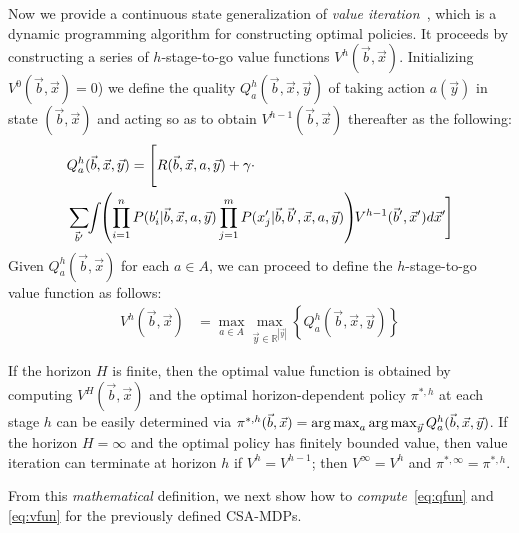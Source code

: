 \label{sec:soln}

Now we provide a continuous state generalization of {\it value
iteration}~\cite{bellman}, which is a dynamic programming algorithm
for constructing optimal policies.  It proceeds by constructing a
series of $h$-stage-to-go value functions $V^h(\vec{b},\vec{x})$.
Initializing $V^0(\vec{b},\vec{x}) = 0$) we define the quality
$Q_a^{h}(\vec{b},\vec{x},\vec{y})$ of taking action $a(\vec{y})$ in state
$(\vec{b},\vec{x})$ and acting so as to obtain
$V^{h-1}(\vec{b},\vec{x})$ thereafter as the following:
\vspace{-4mm}
{\footnotesize
\begin{align}
& Q_a^{h}(\vec{b},\vec{x},\vec{y}) = \Bigg[ R(\vec{b},\vec{x},a,\vec{y}) + \gamma \cdot \label{eq:qfun} \\ 
& \sum_{\vec{b}'} \hspace{-1.0mm} \int \hspace{-1.0mm} \left( \prod_{i=1}^n P(b_i'|\vec{b},\vec{x},a,\vec{y}) \prod_{j=1}^m P(x_j'|\vec{b},\vec{b}',\vec{x},a,\vec{y}) \right) \hspace{-1.0mm} V^{h-1}(\vec{b}',\vec{x}') d\vec{x}'  \hspace{-0.2mm} \Bigg] \nonumber
\end{align}}
Given $Q_a^h(\vec{b},\vec{x})$ for each $a \in A$, we can proceed
to define the $h$-stage-to-go value function as follows:
\begin{align}
V^{h}(\vec{b},\vec{x}) & = \max_{a \in A} \max_{\vec{y} \in \mathbb{R}^{|\vec{y}|}} \left\{ Q^{h}_a(\vec{b},\vec{x},\vec{y}) \right\} \label{eq:vfun}
\end{align}

If the horizon $H$ is finite, then the optimal value function is
obtained by computing $V^H(\vec{b},\vec{x})$ and the optimal
horizon-dependent policy $\pi^{*,h}$ at each stage $h$ can be easily
determined via $\pi^{*,h}(\vec{b},\vec{x}) = \argmax_a
\argmax_{\vec{y}} Q^h_a(\vec{b},\vec{x},\vec{y})$.  If the horizon $H
= \infty$ and the optimal policy has finitely bounded value, then
value iteration can terminate at horizon $h$ if $V^{h} = V^{h-1}$;
then $V^\infty = V^h$ and $\pi^{*,\infty} = \pi^{*,h}$.

From this \emph{mathematical} definition, we next 
show how to \emph{compute}~\eqref{eq:qfun} and \eqref{eq:vfun} 
for the previously defined CSA-MDPs.
